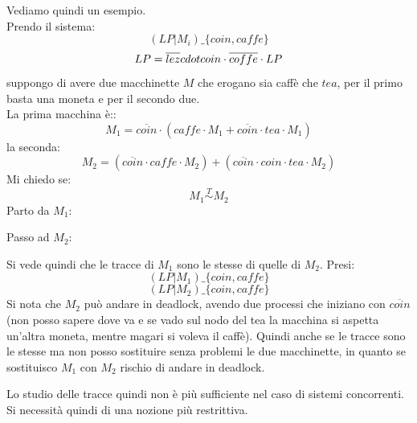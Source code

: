 \documentclass[a4paper,12pt, oneside]{book}
\begin{document}
\begin{esempio}
  Vediamo quindi un esempio.\\
  Prendo il sistema:
  \[(LP|M_i)\_{\{coin,caffe\}}\]
  \[LP=\overline{lez}\\cdot coin\cdot \overline{coffe}\cdot LP\]
  suppongo di avere due macchinette $M$ che erogano sia caffè che $tea$, per il
  primo basta una moneta e per il secondo due.\\
  La prima macchina è::
  \[M_1=\overline{coin}\cdot(caffe\cdot M_1+\overline{coin}\cdot tea\cdot M_1)\]
  la seconda:
  \[M_2=(\overline{coin}\cdot caffe\cdot M_2)+(\overline{coin}\cdot coin \cdot
    tea\cdot M_2)\]
  Mi chiedo se:
  \[M_1\stackrel{T}{\sim} M_2\]
  Parto da $M_1$:
  \begin{center}
  \end{center}
  Passo ad $M_2$:
   \begin{center}
  \end{center}
  Si vede quindi che le tracce di $M_1$ sono le stesse di quelle di $M_2$.
  Presi:
  \[(LP|M_1)\_{\{coin,caffe\}}\]
  \[(LP|M_2)\_{\{coin,caffe\}}\]
  Si nota che $M_2$ può andare in deadlock, avendo due processi che iniziano con
  $\overline{coin}$ (non posso sapere dove va e se vado sul nodo del tea la
  macchina si aspetta un'altra moneta, mentre magari si voleva il caffè). Quindi
  anche se le tracce sono le stesse ma non posso sostituire senza problemi le
  due macchinette, in quanto se sostituisco $M_1$ con $M_2$ rischio di andare in
  deadlock.
  \label{coffe}
\end{esempio}
Lo studio delle tracce quindi non è più sufficiente nel caso di sistemi
concorrenti. Si necessità quindi di una nozione più restrittiva.
\end{document}
